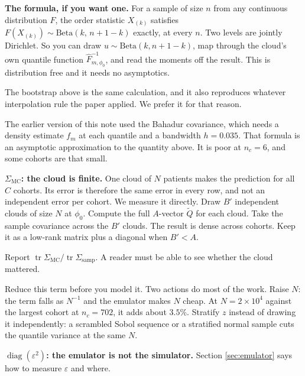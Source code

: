 \documentclass[11pt]{article}
\DeclareMathOperator{\diag}{diag}
\DeclareMathOperator{\tr}{tr}
\begin{document}
\begin{notebox}
\textbf{The formula, if you want one.} For a sample of size $n$ from any
continuous distribution $F$, the order statistic $X_{(k)}$ satisfies
$F(X_{(k)})\sim\mathrm{Beta}(k,\,n{+}1{-}k)$ exactly, at every $n$. Two levels
are jointly Dirichlet. So you can draw $u\sim\mathrm{Beta}(k,n{+}1{-}k)$, map
through the cloud's own quantile function $\widehat F^{-1}_{m,\phi_0}$, and read
the moments off the result. This is distribution free and it needs no
asymptotics.

The bootstrap above is the same calculation, and it also reproduces whatever
interpolation rule the paper applied. We prefer it for that reason.

The earlier version of this note used the Bahadur covariance, which needs a
density estimate $f_m$ at each quantile and a bandwidth $h=0.035$. That formula
is an asymptotic approximation to the quantity above. It is poor at $n_c=6$, and
some cohorts are that small.
\end{notebox}

\textbf{$\Sigma_{\text{MC}}$: the cloud is finite.} One cloud of $N$ patients
makes the prediction for all $C$ cohorts. Its error is therefore the same error
in every row, and not an independent error per cohort. We measure it directly.
Draw $B'$ independent clouds of size $N$ at $\phi_0$. Compute the full $A$-vector
$\widetilde Q$ for each cloud. Take the sample covariance across the $B'$ clouds.
The result is dense across cohorts. Keep it as a low-rank matrix plus a diagonal
when $B'<A$.

Report $\tr\Sigma_{\text{MC}}/\tr\Sigma_{\text{samp}}$. A reader must be able to
see whether the cloud mattered.

Reduce this term before you model it. Two actions do most of the work. Raise
$N$: the term falls as $N^{-1}$ and the emulator makes $N$ cheap. At
$N=2\times10^4$ against the largest cohort at $n_c=702$, it adds about $3.5\%$.
Stratify $z$ instead of drawing it independently: a scrambled Sobol sequence or
a stratified normal sample cuts the quantile variance at the same $N$.

\textbf{$\diag(\varepsilon^2)$: the emulator is not the simulator.} Section
\ref{sec:emulator} says how to measure $\varepsilon$ and where.
\end{document}
